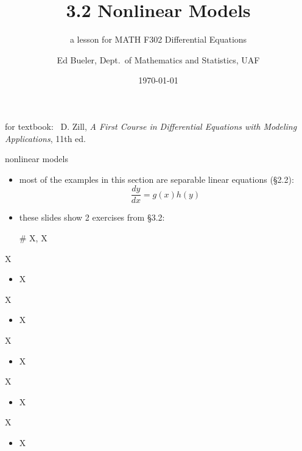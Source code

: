 \documentclass{beamer}
\title{3.2 Nonlinear Models}
\subtitle{a lesson for MATH F302 Differential Equations}
\author{Ed Bueler, Dept.~of Mathematics and Statistics, UAF}
\date{\tiny \today}
\begin{document}

\begin{frame}
\titlepage

\centerline{\tiny for textbook: \, D. Zill, \emph{A First Course in Differential Equations with Modeling Applications}, 11th ed.}
\end{frame}


\begin{frame}{nonlinear models}

\begin{itemize}
\item most of the examples in this section are separable linear equations (\S2.2):
    $$\frac{dy}{dx} = g(x) h(y)$$
\item these slides show 2 exercises from \S3.2:

\hspace{20mm} \# X, X
\end{itemize}
\end{frame}


\begin{frame}{X}

\begin{itemize}
\item X
\end{itemize}
\end{frame}


\begin{frame}{X}

\begin{itemize}
\item X
\end{itemize}
\end{frame}


\begin{frame}{X}

\begin{itemize}
\item X
\end{itemize}
\end{frame}


\begin{frame}{X}

\begin{itemize}
\item X
\end{itemize}
\end{frame}


\begin{frame}{X}

\begin{itemize}
\item X
\end{itemize}
\end{frame}
\end{document}
